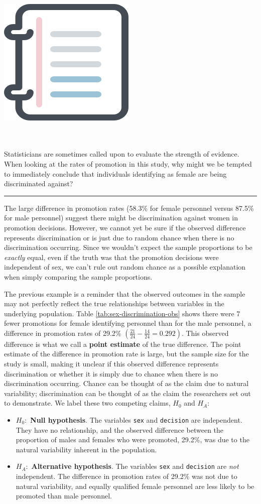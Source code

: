 \documentclass[
  10pt,
  openany]{book}
\providecommand{\tightlist}{%
  \setlength{\itemsep}{0pt}\setlength{\parskip}{0pt}}
\newenvironment{mdframedwithfootGPWE}
{   
    \savenotes
    \begin{mdframed}[%
    topline=true, bottomline=true, linecolor=oiB, linewidth=0.5pt,
    rightline=false, leftline=false,
    backgroundcolor=oiLGray]
    \renewcommand{\thempfootnote}{\arabic{footnote}}
    }
{
    \end{mdframed}
    \spewnotes
}
\newenvironment{workedexample}{
    \let\oldrule\rule
    \renewcommand{\rule}[2]{\vspace{-2mm}\oldrule{##1}{##2}\vspace{-2mm}}
\vspace{4mm}
\begin{mdframedwithfootGPWE}
\begin{minipage}[t]{0.10\textwidth}
{$\:$ \\ \setkeys{Gin}{width=2.5em,keepaspectratio}\includegraphics{images/_icons/worked-example.png}}
\end{minipage}
\hfill
\begin{minipage}[t]{0.90\textwidth}
\vspace{-2mm}
\setlength{\parskip}{1em}
\noindent\textbf{\color{oiB}\small\fontfamily{phv}\selectfont{\MakeUppercase{Example}}} $\:$ \\ \\
}{\end{minipage}
\end{mdframedwithfootGPWE}
\vspace{4mm}
}
\begin{document}
\begin{workedexample}
Statisticians are sometimes called upon to evaluate the strength of evidence.
When looking at the rates of promotion in this study, why might we be tempted to immediately conclude that individuals identifying as female are being discriminated against?

\begin{center}\rule{0.5\linewidth}{0.5pt}\end{center}

The large difference in promotion rates (58.3\% for female personnel versus 87.5\% for male personnel) suggest there might be discrimination against women in promotion decisions.
However, we cannot yet be sure if the observed difference represents discrimination or is just due to random chance when there is no discrimination occurring.
Since we wouldn't expect the sample proportions to be \emph{exactly} equal, even if the truth was that the promotion decisions were independent of sex, we can't rule out random chance as a possible explanation when simply comparing the sample proportions.

\end{workedexample}

The previous example is a reminder that the observed outcomes in the sample may not perfectly reflect the true relationships between variables in the underlying population.
Table \ref{tab:sex-discrimination-obs} shows there were 7 fewer promotions for female identifying personnel than for the male personnel, a difference in promotion rates of 29.2\% \(\left( \frac{21}{24} - \frac{14}{24} = 0.292 \right).\) This observed difference is what we call a \textbf{point estimate} of the true difference.
The point estimate of the difference in promotion rate is large, but the sample size for the study is small, making it unclear if this observed difference represents discrimination or whether it is simply due to chance when there is no discrimination occurring.
Chance can be thought of as the claim due to natural variability; discrimination can be thought of as the claim the researchers set out to demonstrate.
We label these two competing claims, \(H_0\) and \(H_A:\)

\vspace{-2mm}

\begin{itemize}
\tightlist
\item
  \(H_0:\) \textbf{Null hypothesis}.
  The variables \texttt{sex} and \texttt{decision} are independent.
  They have no relationship, and the observed difference between the proportion of males and females who were promoted, 29.2\%, was due to the natural variability inherent in the population.
\item
  \(H_A:\) \textbf{Alternative hypothesis}.
  The variables \texttt{sex} and \texttt{decision} are \emph{not} independent.
  The difference in promotion rates of 29.2\% was not due to natural variability, and equally qualified female personnel are less likely to be promoted than male personnel.
\end{itemize}
\end{document}
